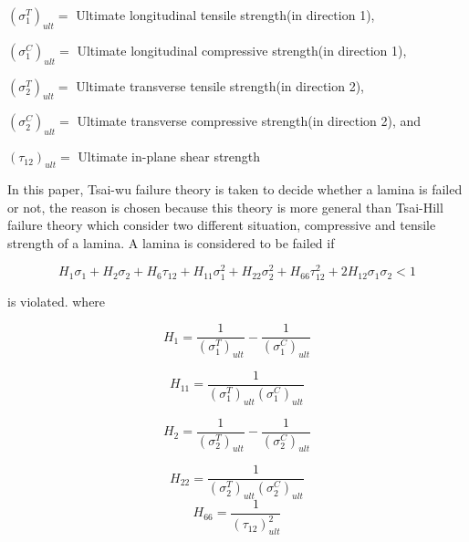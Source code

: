 \documentclass[smallextended]{svjour3}       %
\begin{document}
\vspace{3mm}

$(\sigma_1^T)_{ult}=$ Ultimate longitudinal tensile strength(in direction 1),

$(\sigma_1^C)_{ult}=$ Ultimate longitudinal compressive strength(in direction 1),

$(\sigma_2^T)_{ult}=$ Ultimate transverse tensile strength(in direction 2),

$(\sigma_2^C)_{ult}=$ Ultimate transverse compressive strength(in direction 2), and

$(\tau_{12})_{ult}=$ Ultimate in-plane shear strength

\vspace{3mm}

In this paper, Tsai-wu failure theory is taken to decide whether a lamina is failed or not, the
reason is chosen because this theory is  more general than Tsai-Hill failure theory which consider
two different situation, compressive and tensile strength of a lamina. A lamina is considered to be
failed if


\begin{equation} \label{eq:tsai_wu}
H_1 \sigma_1 + H_2 \sigma_2 + H_6 \tau_{12} + H_{11}\sigma_1^2 + H_{22} \sigma_2^2 + H_{66}
\tau_{12}^2 + 2H_{12}\sigma_1\sigma_2 < 1
\end{equation}
 
is violated. where

\begin{equation} 
	H_{1}=\frac{1}{\left(\sigma_{1}^{T}\right)_{u l t}}-\frac{1}{\left(\sigma_{1}^{C}\right)_{u l
	t}}
\end{equation}

\begin{equation}
	H_{11}=\frac{1}{\left(\sigma_{1}^{T}\right)_{u l t}\left(\sigma_{1}^{C}\right)_{u l t}}
\end{equation}

\begin{equation}
	H_{2}=\frac{1}{\left(\sigma_{2}^{T}\right)_{u l t}}-\frac{1}{\left(\sigma_{2}^{C}\right)_{u l
	t}}
\end{equation}

\begin{equation}
	H_{22}=\frac{1}{\left(\sigma_{2}^{T}\right)_{u l t}\left(\sigma_{2}^{C}\right)_{u l t}}
\end{equation}
\begin{equation}
	H_{66}=\frac{1}{\left(\tau_{12}\right)_{u l t}^{2}}
\end{equation}
\end{document}
